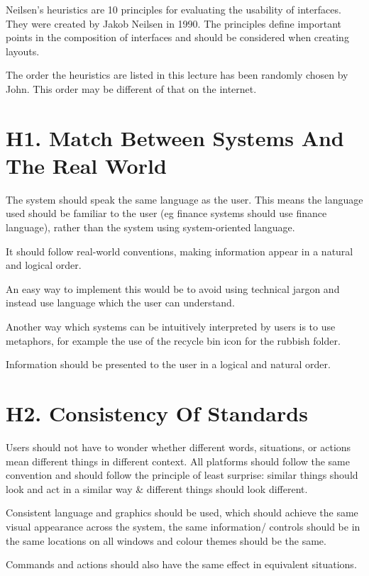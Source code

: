 
Neilsen's heuristics are 10 principles for evaluating the usability of interfaces. They were created by Jakob Neilsen in 1990. The principles define important points in the composition of interfaces and should be considered when creating layouts.

The order the heuristics are listed in this lecture has been randomly chosen by John. This order may be different of that on the internet.

\section{H1. Match Between Systems And The Real World}
The system should speak the same language as the user. This means the language used should be familiar to the user (eg finance systems should use finance language), rather than the system using system-oriented language. 

It should follow real-world conventions, making information appear in a natural and logical order. 

An easy way to implement this would be to avoid using technical jargon and instead use language which the user can understand.

Another way which systems can be intuitively interpreted by users is to use metaphors, for example the use of the recycle bin icon for the rubbish folder. 

Information should be presented to the user in a logical and natural order. 

\section{H2. Consistency Of Standards}
Users should not have to wonder whether different words, situations, or actions mean different things in different context. All platforms should follow the same convention and should follow the principle of least surprise: similar things should look and act in a similar way \& different things should look different.

Consistent language and graphics should be used, which should achieve the same visual appearance across the system, the same information/ controls should be in the same locations on all windows and colour themes should be the same. 

Commands and actions should also have the same effect in equivalent situations.

